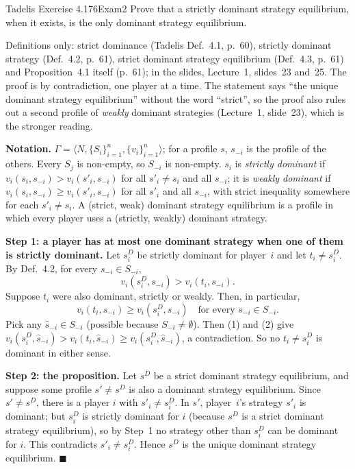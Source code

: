 \begin{exsol}{Tadelis Exercise 4.1}{76}{Exam}{2}
\asked Prove that a strictly dominant strategy equilibrium, when it exists, is the only dominant
strategy equilibrium.

\method Definitions only: strict dominance (Tadelis Def.~4.1, p.~60), strictly dominant strategy
(Def.~4.2, p.~61), strict dominant strategy equilibrium (Def.~4.3, p.~61) and Proposition~4.1
itself (p.~61); in the slides, Lecture~1, slides~23 and~25. The proof is by contradiction, one
player at a time. The statement says ``the unique dominant strategy equilibrium'' without the word
``strict'', so the proof also rules out a second profile of \emph{weakly} dominant strategies
(Lecture~1, slide~23), which is the stronger reading.

\solution
\textbf{Notation.} $\Gamma = \langle N, \{S_i\}_{i=1}^n, \{v_i\}_{i=1}^n\rangle$; for a profile
$s$, $s_{-i}$ is the profile of the others. Every $S_j$ is non-empty, so $S_{-i}$ is non-empty.
$s_i$ is \emph{strictly dominant} if $v_i(s_i, s_{-i}) > v_i(s'_i, s_{-i})$ for all
$s'_i \ne s_i$ and all $s_{-i}$; it is \emph{weakly dominant} if $v_i(s_i, s_{-i}) \ge
v_i(s'_i, s_{-i})$ for all $s'_i$ and all $s_{-i}$, with strict inequality somewhere for each
$s'_i \ne s_i$. A (strict, weak) dominant strategy equilibrium is a profile in which every player
uses a (strictly, weakly) dominant strategy.

\textbf{Step 1: a player has at most one dominant strategy when one of them is strictly
dominant.} Let $s_i^D$ be strictly dominant for player~$i$ and let $t_i \ne s_i^D$. By
Def.~4.2, for every $s_{-i} \in S_{-i}$,
\[
  v_i(s_i^D, s_{-i}) > v_i(t_i, s_{-i}). \tag{1}
\]
Suppose $t_i$ were also dominant, strictly or weakly. Then, in particular,
\[
  v_i(t_i, s_{-i}) \ge v_i(s_i^D, s_{-i}) \quad \text{for every } s_{-i} \in S_{-i}. \tag{2}
\]
Pick any $\hat s_{-i} \in S_{-i}$ (possible because $S_{-i} \ne \emptyset$). Then (1) and (2) give
$v_i(s_i^D, \hat s_{-i}) > v_i(t_i, \hat s_{-i}) \ge v_i(s_i^D, \hat s_{-i})$, a contradiction.
So no $t_i \ne s_i^D$ is dominant in either sense.

\textbf{Step 2: the proposition.} Let $s^D$ be a strict dominant strategy equilibrium, and suppose
some profile $s' \ne s^D$ is also a dominant strategy equilibrium. Since $s' \ne s^D$, there is a
player $i$ with $s'_i \ne s_i^D$. In $s'$, player~$i$'s strategy $s'_i$ is dominant; but $s_i^D$ is
strictly dominant for $i$ (because $s^D$ is a strict dominant strategy equilibrium), so by Step~1
no strategy other than $s_i^D$ can be dominant for $i$. This contradicts $s'_i \ne s_i^D$. Hence
$s^D$ is the unique dominant strategy equilibrium. $\blacksquare$


\end{exsol}
